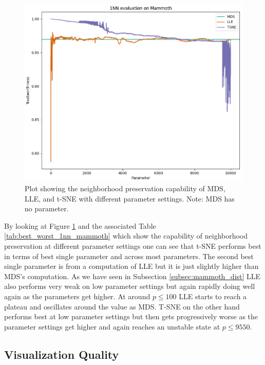 \begin{figure}[!]
	\centering
	\includegraphics[width=1\columnwidth]{images/1NN_MAMM_all.png}
	\caption[3D-Mammoth Neighborhood Preservation]{Plot showing the neighborhood preservation capability of MDS, LLE, and t-SNE with different parameter settings. Note: MDS has no parameter.}
    \label{fig:1NN_MAMM_all}
\end{figure}

By looking at Figure \ref{fig:1NN_MAMM_all} and the associated Table \ref{tab:best_worst_1nn_mammoth} which show the capability of neighborhood preservation at different parameter settings one can see that t-SNE performs best in terms of best single parameter and across most parameters. The second best single parameter is from a computation of LLE but it is just slightly higher than MDS's computation. As we have seen in Subsection \ref{subsec:mammoth_dist} LLE also performs very weak on low parameter settings but again rapidly doing well again as the parameters get higher. At around $p\leq 100$ LLE starts to reach a plateau and oscillates around the value as MDS. T-SNE on the other hand performs best at low parameter settings but then gets progressively worse as the parameter settings get higher and again reaches an unstable state at $p\leq 9550$.

\subsection{Visualization Quality} \label{subsec:visqual_mamoth}

